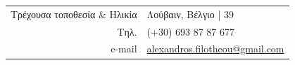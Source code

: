 \documentclass[a4paper,10pt,twoside]{article}
\begin{document}


\par{\bigskip\par}
\vspace{4em}
\begin{center}
\begin{tabular}{rp{10cm}}
Τρέχουσα τοποθεσία \& Ηλικία & Λούβαιν, Βέλγιο | $39$ \\
Τηλ.                         & (+30) 693 87 87 677 \\
e-mail                       & \href{mailto:alexandros.filotheou@gmail.com}{alexandros.filotheou@gmail.com}
\end{tabular}
\end{center}
\vfill
\end{document}
